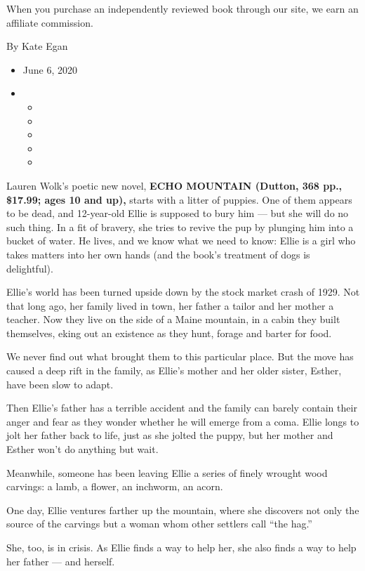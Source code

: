 When you purchase an independently reviewed book through our site, we
earn an affiliate commission.

By Kate Egan

\begin{itemize}
\item
  June 6, 2020
\item
  \begin{itemize}
  \item
  \item
  \item
  \item
  \item
  \end{itemize}
\end{itemize}

Lauren Wolk's poetic new novel, \textbf{ECHO MOUNTAIN (Dutton, 368 pp.,
\$17.99; ages 10 and up),} starts with a litter of puppies. One of them
appears to be dead, and 12-year-old Ellie is supposed to bury him ---
but she will do no such thing. In a fit of bravery, she tries to revive
the pup by plunging him into a bucket of water. He lives, and we know
what we need to know: Ellie is a girl who takes matters into her own
hands (and the book's treatment of dogs is delightful).

Ellie's world has been turned upside down by the stock market crash of
1929. Not that long ago, her family lived in town, her father a tailor
and her mother a teacher. Now they live on the side of a Maine mountain,
in a cabin they built themselves, eking out an existence as they hunt,
forage and barter for food.

We never find out what brought them to this particular place. But the
move has caused a deep rift in the family, as Ellie's mother and her
older sister, Esther, have been slow to adapt.

Then Ellie's father has a terrible accident and the family can barely
contain their anger and fear as they wonder whether he will emerge from
a coma. Ellie longs to jolt her father back to life, just as she jolted
the puppy, but her mother and Esther won't do anything but wait.

Meanwhile, someone has been leaving Ellie a series of finely wrought
wood carvings: a lamb, a flower, an inchworm, an acorn.

One day, Ellie ventures farther up the mountain, where she discovers not
only the source of the carvings but a woman whom other settlers call
``the hag.''

She, too, is in crisis. As Ellie finds a way to help her, she also finds
a way to help her father --- and herself.

